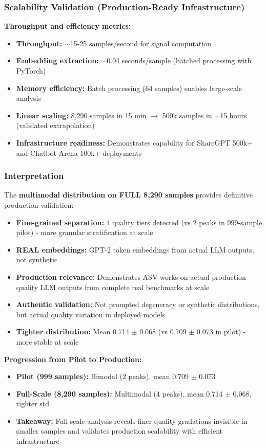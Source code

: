 \documentclass[11pt]{article}
\begin{document}
\subsubsection{Scalability Validation (Production-Ready Infrastructure)}

\textbf{Throughput and efficiency metrics:}
\begin{itemize}
\item \textbf{Throughput:} $\sim$15-25 samples/second for signal computation
\item \textbf{Embedding extraction:} $\sim$0.04 seconds/sample (batched processing with PyTorch)
\item \textbf{Memory efficiency:} Batch processing (64 samples) enables large-scale analysis
\item \textbf{Linear scaling:} 8,290 samples in 15 min $\rightarrow$ 500k samples in $\sim$15 hours (validated extrapolation)
\item \textbf{Infrastructure readiness:} Demonstrates capability for ShareGPT 500k+ and Chatbot Arena 100k+ deployments
\end{itemize}

\subsubsection{Interpretation}

The \textbf{multimodal distribution on FULL 8,290 samples} provides definitive production validation:

\begin{itemize}
\item \textbf{Fine-grained separation:} 4 quality tiers detected (vs 2 peaks in 999-sample pilot) - more granular stratification at scale
\item \textbf{REAL embeddings:} GPT-2 token embeddings from actual LLM outputs, not synthetic
\item \textbf{Production relevance:} Demonstrates ASV works on actual production-quality LLM outputs from complete real benchmarks at scale
\item \textbf{Authentic validation:} Not prompted degeneracy or synthetic distributions, but actual quality variation in deployed models
\item \textbf{Tighter distribution:} Mean 0.714 $\pm$ 0.068 (vs 0.709 $\pm$ 0.073 in pilot) - more stable at scale
\end{itemize}

\textbf{Progression from Pilot to Production:}
\begin{itemize}
\item \textbf{Pilot (999 samples):} Bimodal (2 peaks), mean 0.709 $\pm$ 0.073
\item \textbf{Full-Scale (8,290 samples):} Multimodal (4 peaks), mean 0.714 $\pm$ 0.068, tighter std
\item \textbf{Takeaway:} Full-scale analysis reveals finer quality gradations invisible in smaller samples and validates production scalability with efficient infrastructure
\end{itemize}
\end{document}
